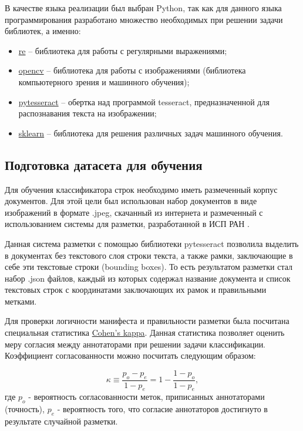 \documentclass[a4paper,12pt]{article}
\begin{document}
В качестве языка реализации был выбран Python, так как для данного языка программирования разработано множество необходимых при решении задачи библиотек, а именно:

\begin{itemize}
\item \href{https://docs.python.org/3/library/re.html}{re} -- библиотека для работы с регулярными выражениями;
\item \href{https://opencv.org}{opencv} -- библиотека для работы с изображениями (библиотека компьютерного зрения и машинного обучения);
\item \href{https://pypi.org/project/pytesseract/}{pytesseract} -- обертка над программой tesseract, предназначенной для распознавания текста на изображении;
\item \href{https://scikit-learn.org}{sklearn} -- библиотека для решения различных задач машинного обучения.
\end{itemize}

\subsection{Подготовка датасета для обучения}

Для обучения классификатора строк необходимо иметь размеченный корпус документов. Для этой цели был использован набор документов в виде изображений в формате .jpeg, скачанный из интернета и размеченный с использованием системы для разметки, разработанной в ИСП РАН \cite{link6}.

Данная система разметки с помощью библиотеки pytesseract позволила выделить в документах без текстового слоя строки текста, а также рамки, заключающие в себе эти текстовые строки (bounding boxes). То есть результатом разметки стал набор .json файлов, каждый из которых содержал название документа и список текстовых строк с координатами заключающих их рамок и правильными метками.

Для проверки логичности манифеста и правильности разметки была посчитана специальная статистика \href{https://en.wikipedia.org/wiki/Cohen%27s_kappa}{Cohen's kappa}. Данная статистика позволяет оценить меру согласия между аннотаторами при решении задачи классификации. Коэффициент согласованности можно посчитать следующим образом:

$$ \kappa \equiv {\frac {p_o-p_e}{1-p_e}}=1-{\frac {1-p_o}{1-p_e}},$$
где $p_o$ - вероятность согласованности меток, приписанных аннотаторами (точность), $p_e$ - вероятность того, что согласие аннотаторов достигнуто в результате случайной разметки.
\end{document}
